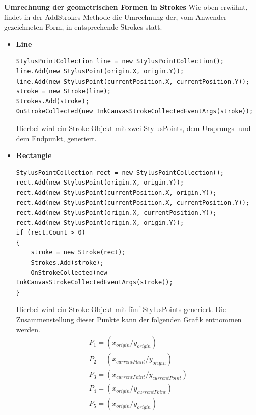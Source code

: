 \textbf{Umrechnung der geometrischen Formen in Strokes}
Wie oben erwähnt, findet in der AddStrokes Methode die Umrechnung der, vom Anwender gezeichneten Form, in entsprechende Strokes statt. 
\begin{itemize}
\item \textbf{Line}\\ 
\begin{lstlisting}[language = CSharp, captionpos=b, caption={Linie in Strokes konvertieren}]
StylusPointCollection line = new StylusPointCollection();
line.Add(new StylusPoint(origin.X, origin.Y));
line.Add(new StylusPoint(currentPosition.X, currentPosition.Y));
stroke = new Stroke(line);
Strokes.Add(stroke);
OnStrokeCollected(new InkCanvasStrokeCollectedEventArgs(stroke));
\end{lstlisting}
Hierbei wird ein Stroke-Objekt mit zwei StylusPoints, dem Ursprungs- und dem Endpunkt, generiert.
\item \textbf{Rectangle}\\ 
\begin{lstlisting}[language = CSharp, captionpos=b, caption={Rechteck in Strokes konvertieren}]
StylusPointCollection rect = new StylusPointCollection();
rect.Add(new StylusPoint(origin.X, origin.Y));
rect.Add(new StylusPoint(currentPosition.X, origin.Y));
rect.Add(new StylusPoint(currentPosition.X, currentPosition.Y));
rect.Add(new StylusPoint(origin.X, currentPosition.Y));
rect.Add(new StylusPoint(origin.X, origin.Y));
if (rect.Count > 0)
{
	stroke = new Stroke(rect);
	Strokes.Add(stroke);
	OnStrokeCollected(new InkCanvasStrokeCollectedEventArgs(stroke));
}
\end{lstlisting}
Hierbei wird ein Stroke-Objekt mit fünf StylusPoints generiert. Die Zusammenstellung dieser Punkte kann der folgenden Grafik entnommen werden.
\begin{align}
P_1 = (x_{origin} / y_{origin})\\
P_2 = (x_{currentPoint} / y_{origin})\\
P_3 = (x_{currentPoint} / y_{currentPoint})\\
P_4 = (x_{origin} / y_{currentPoint})\\
P_5 = (x_{origin} / y_{origin})
\end{align}


\end{itemize}
